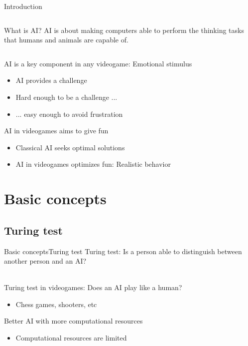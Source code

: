 \documentclass[10pt,compress]{beamer} %
\begin{document}
\begin{frame}{Introduction}
    \begin{columns}
	\vspace{-0.5cm}
		\vspace{-0.5cm}
		\begin{block}{What is AI?}
		AI is about making computers able to perform the thinking tasks that humans and animals are capable of.\\
		\end{block}
	\end{columns}
		\vspace{0.25cm}
	AI is a key component in any videogame: \alert{Emotional stimulus}
	\begin{itemize}
		\item AI provides a challenge
		\item Hard enough to be a challenge ...
		\item ... easy enough to avoid frustration
  	\end{itemize}
	AI in videogames aims to give fun
	\begin{itemize}
		\item Classical AI seeks optimal solutions
		\item AI in videogames optimizes fun: Realistic behavior
  	\end{itemize}
\end{frame}

\section{Basic concepts}
\subsection{Turing test}
\begin{frame}{Basic concepts}{Turing test}
	   Turing test: Is a person able to distinguish between another person and an AI?\\
		\\
		\raggedright Turing test in videogames: Does an AI play like a human?
 	 	\begin{itemize}
		\item Chess games, shooters, etc
		\end{itemize}
		Better AI with more computational resources
 	 	\begin{itemize}
		\item Computational resources are limited
		\end{itemize}
\end{frame}
\end{document}
